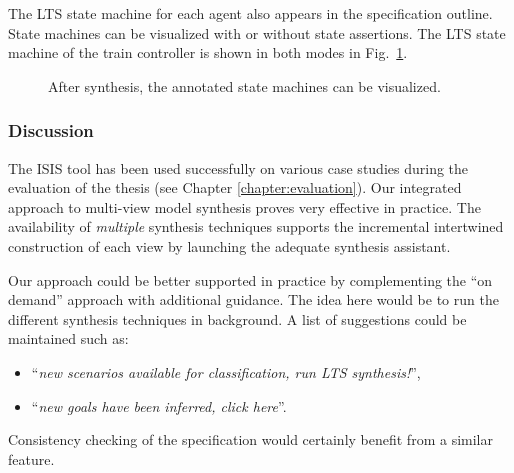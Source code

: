 The LTS state machine for each agent also appears in the specification outline. State machines can be visualized with or without state assertions. The LTS state machine of the train controller is shown in both modes in Fig.~\ref{image:isis-after}. 

\begin{figure}
\centering{}
  \caption{After synthesis, the annotated state machines can be visualized.\label{image:isis-after}}
\end{figure}

\subsubsection*{Discussion}

The ISIS tool has been used successfully on various case studies during the evaluation of the thesis (see Chapter \ref{chapter:evaluation}). Our integrated approach to multi-view model synthesis proves very effective in practice. The availability of \emph{multiple} synthesis techniques supports the incremental intertwined construction of each view by launching the adequate synthesis assistant.

Our approach could be better supported in practice by complementing the ``on demand'' approach with additional guidance. The idea here would be to run the different synthesis techniques in background. A list of suggestions could be maintained such as:
\begin{itemize}
\item ``\emph{new scenarios available for classification, run LTS synthesis!}'',
\item ``\emph{new goals have been inferred, click here}''. 
\end{itemize}
Consistency checking of the specification would certainly benefit from a similar feature. 

